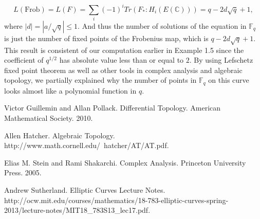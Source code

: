 \documentclass[psamsfonts]{amsart}
\theoremstyle{definition}
\theoremstyle{remark}
\numberwithin{equation}{section}
\begin{document}
	\begin{equation}
		L(\mathrm{Frob}) = L(F) = \sum_i (-1)^i Tr(F_*: H_i(E(\mathbb{C}))) = q - 2d\sqrt{q} + 1,
	\end{equation}
	where $|d| = |a/ \sqrt{q}| \leq 1$. And thus the number of solutions of the equation in $\mathbb{F}_q$ is just the number of fixed points of the Frobenius map, which is $q - 2d \sqrt{q} + 1$.\\
	\indent This result is consistent of our computation earlier in Example 1.5 since the coefficient of $q^{1/2}$ has absolute value less than or equal to $2$. By using Lefschetz fixed point theorem as well as other tools in complex analysis and algebraic topology, we partially explained why the number of points in $\mathbb{F}_q$ on this curve looks almost like a polynomial function in $q$.
	
	
	\begin{thebibliography}{9}
	
	Victor Guillemin and Allan Pollack.
	Differential Topology.
	American Mathematical Society. 2010.	
	
	Allen Hatcher.
	Algebraic Topology.
	http://www.math.cornell.edu/~hatcher/AT/AT.pdf.
	
	Elias M. Stein and Rami Shakarchi.
	Complex Analysis.
	Princeton University Press. 2005. 	
	
	Andrew Sutherland.
	Elliptic Curves Lecture Notes.
	http://ocw.mit.edu/courses/mathematics/18-783-elliptic-curves-spring-2013/lecture-notes/MIT18{\_}783S13{\_}lec17.pdf.
	
	
\end{thebibliography}
\end{document}
